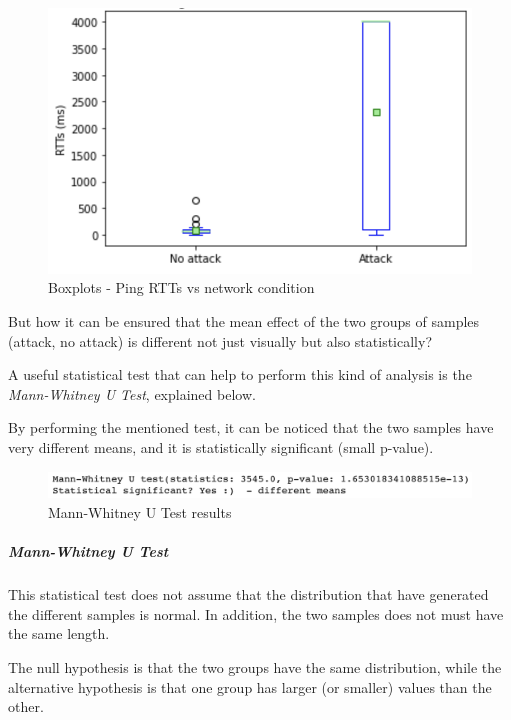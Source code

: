 \documentclass[fleqn, 11pt]{SelfArx} %
\begin{document}
\begin{figure}[H]
	\centering
    \includegraphics[width=\linewidth]{./ping/ping-boxplot1.png}
    \caption{Boxplots - Ping RTTs vs network condition}
	\label{fig:ping-boxplot1}%
\end{figure}

But how it can be ensured that the mean effect of the two groups of samples (attack, no attack) is different not just visually but also statistically\mbox{?}

A useful statistical test that can help to perform this kind of analysis is the {\it{Mann-Whitney U Test}}, explained below.

By performing the mentioned test, it can be noticed that the two samples have very different means, and it is statistically significant (small p-value).

\begin{figure}[H]\centering
    \includegraphics[width=\linewidth]{./ping/mannwhitneyu1.png}
    \caption{Mann-Whitney U Test results}
	\label{fig:mannwhitneyu1}
\end{figure}

\subparagraph{Mann-Whitney U Test \cite{MannWhitneyU}}
This statistical test does not assume that the distribution that have generated the different samples is normal.
In addition, the two samples does not must have the same length.

The null hypothesis is that the two groups have the same distribution, while the alternative hypothesis is that one group has larger (or smaller) values than the other.\\
\end{document}
